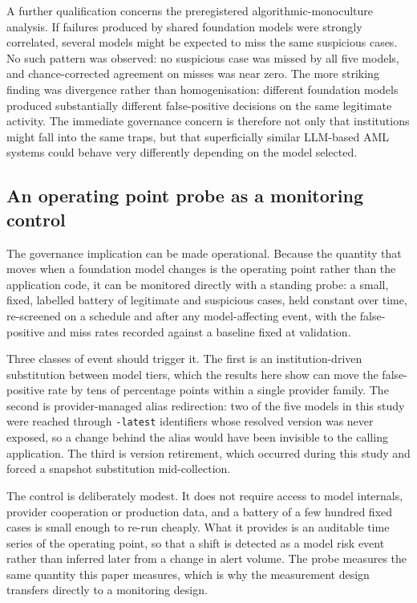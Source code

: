 \documentclass[pdflatex,sn-basic,Numbered]{sn-jnl}
\begin{document}
A further qualification concerns the preregistered algorithmic-monoculture analysis. If failures produced by shared foundation models were strongly correlated, several models might be expected to miss the same suspicious cases. No such pattern was observed: no suspicious case was missed by all five models, and chance-corrected agreement on misses was near zero. The more striking finding was divergence rather than homogenisation: different foundation models produced substantially different false-positive decisions on the same legitimate activity. The immediate governance concern is therefore not only that institutions might fall into the same traps, but that superficially similar LLM-based AML systems could behave very differently depending on the model selected.

\subsection{An operating point probe as a monitoring control}\label{sec:probe}

The governance implication can be made operational. Because the quantity that moves when a foundation model changes is the operating point rather than the application code, it can be monitored directly with a standing probe: a small, fixed, labelled battery of legitimate and suspicious cases, held constant over time, re-screened on a schedule and after any model-affecting event, with the false-positive and miss rates recorded against a baseline fixed at validation.

Three classes of event should trigger it. The first is an institution-driven substitution between model tiers, which the results here show can move the false-positive rate by tens of percentage points within a single provider family. The second is provider-managed alias redirection: two of the five models in this study were reached through \texttt{-latest} identifiers whose resolved version was never exposed, so a change behind the alias would have been invisible to the calling application. The third is version retirement, which occurred during this study and forced a snapshot substitution mid-collection.

The control is deliberately modest. It does not require access to model internals, provider cooperation or production data, and a battery of a few hundred fixed cases is small enough to re-run cheaply. What it provides is an auditable time series of the operating point, so that a shift is detected as a model risk event rather than inferred later from a change in alert volume. The probe measures the same quantity this paper measures, which is why the measurement design transfers directly to a monitoring design.
\end{document}
